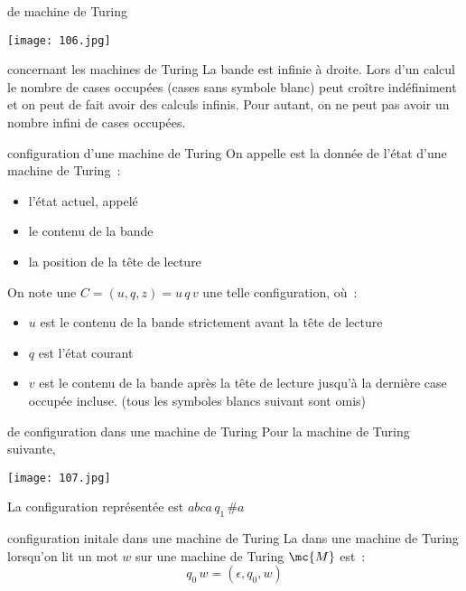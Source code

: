 \begin{exemple}{}{de machine de Turing}
    \begin{center}
        \texttt{[image: 106.jpg]}
    \end{center}
    
\end{exemple}

\begin{remarque}{}{concernant les machines de Turing}
    La bande est infinie à droite. Lors d'un calcul le nombre de cases occupées (cases sans symbole blanc) peut croître indéfiniment et on peut de fait avoir des calculs infinis. Pour autant, on ne peut pas avoir un nombre infini de cases occupées.
\end{remarque}

\begin{definition}{}{configuration d'une machine de Turing}
    On appelle  est la donnée de l'état d'une machine de Turing~:
    \begin{itemize}
        \item l'état actuel, appelé 
        \item le contenu de la bande
        \item la position de la tête de lecture
    \end{itemize}
    On note une $C = (u,q,z) = u\,q\,v$ une telle configuration, où~:
    \begin{itemize}
        \item $u$ est le contenu de la bande strictement avant la tête de lecture
        \item $q$ est l'état courant
        \item $v$ est le contenu de la bande après la tête de lecture jusqu'à la dernière case occupée incluse. (tous les symboles blancs suivant sont omis)
    \end{itemize}
\end{definition}

\begin{exemple}{}{de configuration dans une machine de Turing}
    Pour la machine de Turing suivante,
    \begin{center}
        \texttt{[image: 107.jpg]}
    \end{center}
    La configuration représentée est $abca \, q_1 \, \#a $
\end{exemple}

\begin{definition}{}{configuration initale dans une machine de Turing}
    La  dans une machine de Turing lorsqu'on lit un mot $w$ sur une machine de Turing $\mc{M}$ est~:
    $$q_0\, w = (\epsilon, q_0, w)$$
\end{definition}

